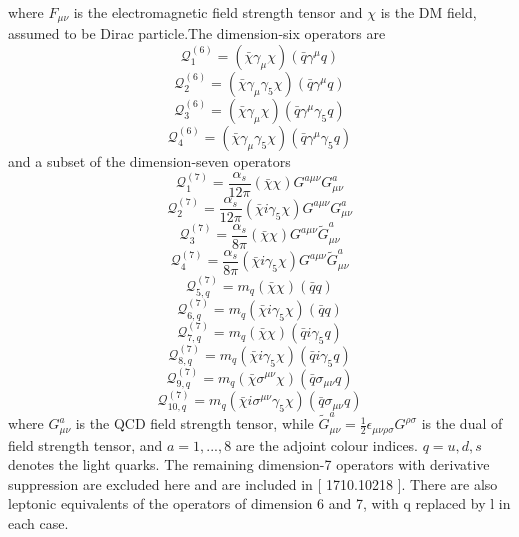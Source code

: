 \documentclass[12pt]{article}
\begin{document}
where $F_{\mu\nu}$ is the electromagnetic field strength tensor and $\chi$ is the DM field, assumed to be Dirac particle.The dimension-six operators are
$$
  \mathcal Q_1^{(6)} = (\bar \chi \gamma_\mu \chi ) (\bar q \gamma^\mu q)
$$
$$
  \mathcal Q_2^{(6)} = (\bar \chi \gamma_\mu \gamma_5 \chi ) (\bar q \gamma^\mu q)
$$
$$
  \mathcal Q_3^{(6)} = (\bar \chi \gamma_\mu \chi ) (\bar q \gamma^\mu \gamma_5 q)
$$
$$
  \mathcal Q_4^{(6)} = (\bar \chi \gamma_\mu \gamma_5 \chi ) (\bar q \gamma^\mu \gamma_5  q)
$$
and a subset of the dimension-seven operators 
$$
  \mathcal Q_1^{(7)} = \frac {\alpha_s}{12\pi} (\bar \chi   \chi ) G^{a \mu \nu} G^a_{\mu \nu} 
$$
$$
  \mathcal Q_2^{(7)} = \frac {\alpha_s}{12\pi} (\bar \chi  i \gamma_5  \chi ) G^{a \mu \nu} G^a_{\mu \nu} 
$$
$$
  \mathcal Q_3^{(7)} = \frac {\alpha_s}{8\pi} (\bar \chi   \chi ) G^{a \mu \nu}  \tilde G^a_{\mu \nu} 
$$
$$
  \mathcal Q_4^{(7)} = \frac {\alpha_s}{8\pi} (\bar \chi i \gamma_5   \chi ) G^{a \mu \nu} \tilde G^a_{\mu \nu} 
$$
$$
  \mathcal Q_{5,q}^{(7)} = m_q (\bar \chi  \chi ) (\bar q  q)
  $$
 $$
   \mathcal Q_{6,q}^{(7)} = m_q (\bar \chi  i \gamma_5 \chi ) (\bar q  q)
$$
$$  
 \mathcal Q_{7,q}^{(7)} = m_q (\bar \chi  \chi ) (\bar q  i \gamma_5 q)
$$
$$
   \mathcal Q_{8,q}^{(7)}  = m_q (\bar \chi  i \gamma_5 \chi ) (\bar q   i \gamma_5 q)
$$
$$
 \mathcal Q_{9,q}^{(7)} = m_q (\bar \chi \sigma^{\mu \nu} \chi ) (\bar q \sigma_{\mu \nu} q )
$$
$$
 \mathcal Q_{10,q}^{(7)} = m_q (\bar \chi i \sigma^{\mu \nu} \gamma_5 \chi ) (\bar q \sigma_{\mu \nu} q )
$$
where $G^a_{\mu \nu} $ is the QCD field strength tensor, while $\tilde G^a_{\mu \nu} = \frac{1}{2} \epsilon_{\mu \nu \rho \sigma} G^{\rho \sigma}$ is the dual of field strength tensor, and $a = 1,...,8$ are the adjoint colour indices. $q=u,d,s$ denotes the light quarks. The remaining dimension-7 operators with derivative suppression are excluded here and are included in [ 1710.10218 ]. There are also leptonic equivalents of the operators of dimension 6 and 7, with q replaced by l in each case. 
\end{document}
